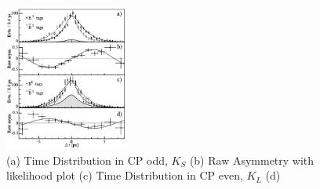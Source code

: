  \begin{figure}[h]
\centering
\includegraphics[width=0.36\textwidth]{figs/cpf.JPG}
\caption{(a) Time Distribution in CP odd, $K_{S}$ (b) Raw Asymmetry with likelihood plot (c) Time Distribution in CP even, $K_{L}$  (d)}
\label{BBD}
\end{figure}




